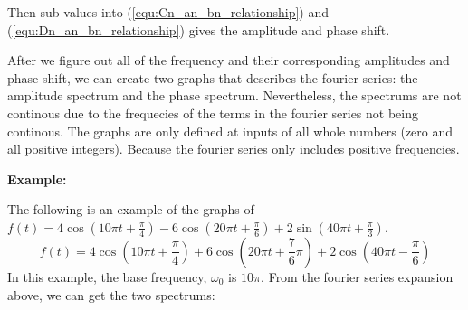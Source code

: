 \documentclass[12pt]{article}
\begin{document}
\indent Then sub values into ({\ref{equ:Cn_an_bn_relationship}}) and ({\ref{equ:Dn_an_bn_relationship}}) 
gives the amplitude and phase shift.

\indent After we figure out all of the frequency and their corresponding amplitudes and phase shift, 
we can create two graphs that describes the fourier series: the amplitude spectrum and the phase spectrum.
Nevertheless, the spectrums are not continous due to the frequecies of 
the terms in the fourier series not being continous. The graphs are only defined at inputs of all whole numbers 
(zero and all positive integers). Because the fourier series only includes positive frequencies.
 

\textbf{Example:}

The following is an example of the graphs of 
$f(t) = 4\cos(10\pi t+\frac{\pi}{4}) - 6\cos(20\pi t+\frac{\pi}{6}) + 2\sin(40\pi t+\frac{\pi}{3})$.
$$f(t)= 4\cos(10\pi t+\frac{\pi}{4}) + 6\cos(20\pi t+\frac{7}{6}\pi) + 2\cos(40\pi t-\frac{\pi}{6})$$
\indent In this example, the base frequency, $\omega_0$ is $10\pi$.
From the fourier series expansion above, we can get the two spectrums:\newline
\end{document}
